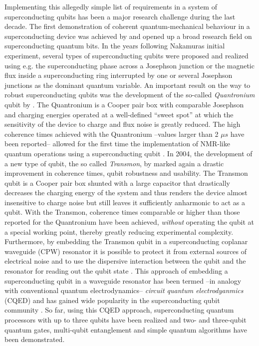Implementing this allegedly simple list of requirements in a system of superconducting qubits has been a major research challenge during the last decade. The first demonstration of coherent quantum-mechanical behaviour in a superconducting device was achieved by \cite{nakamura_coherent_1999} and opened up a broad research field on superconducting quantum bits. In the years following Nakamuras initial experiment, several types of superconducting qubits were proposed and realized using e.g. the superconducting phase across a Josephson junction \citep{martinis_energy-level_1985,martinis_rabi_2002} or the magnetic flux inside a superconducting ring interrupted by one or several Josephson junctions \citep{mooij_josephson_1999,chiorescu_coherent_2003} as the dominant quantum variable. An important result on the way to robust superconducting qubits was the development of the so-called {\it Quantronium} qubit by \cite{vion_manipulating_2002}. The Quantronium is a Cooper pair box with comparable Josephson and charging energies operated at a well-defined ``sweet spot'' at which the sensitivity of the device to charge and flux noise is greatly reduced. The high coherence times achieved with the Quantronium --values larger than 2 $\mu s$ have been reported-- allowed for the first time the implementation of NMR-like quantum operations using a superconducting qubit \citep{collin_nmr-like_2004}. In 2004, the development of a new type of qubit, the so called {\it Transmon}, by \cite{wallraff_strong_2004} marked again a drastic improvement in coherence times, qubit robustness and usability. The Transmon qubit is a Cooper pair box shunted with a large capacitor that drastically decreases the charging energy of the system and thus renders the device almost insensitive to charge noise but still leaves it sufficiently anharmonic to act as a qubit. With the Transmon, coherence times comparable or higher than those reported for the Quantronium have been achieved, {\it without} operating the qubit at a special working point, thereby greatly reducing experimental complexity. Furthermore, by embedding the Transmon qubit in a superconducting coplanar waveguide (CPW) resonator it is possible to protect it from external sources of electrical noise and to use the dispersive interaction between the qubit and the resonator for reading out the qubit state \citep{blais_cavity_2004}. This approach of embedding a superconducting qubit in a waveguide resonator has been termed --in analogy with conventional quantum electrodynamics-- {\it circuit quantum electrodyanmics} (CQED) and has gained wide popularity in the superconducting qubit community . So far, using this CQED approach, superconducting quantum processors with up to three qubits have been realized and two- and three-qubit quantum gates, multi-qubit entanglement \citep{dicarlo_preparation_2010} and simple quantum algorithms \citep{dicarlo_demonstration_2009} have been demonstrated.

